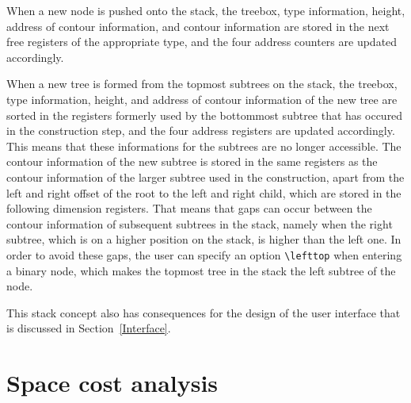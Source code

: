                                                                                 
When a new node is pushed onto the stack, the treebox, type information,        
height, address of contour information, and contour information are             
stored in the next free registers of the appropriate type, and the              
four address counters are updated accordingly.                                  
                                                                                
When a new tree is formed from the topmost subtrees on the stack,               
the treebox, type information, height, and address of contour information       
of the new tree are sorted in the registers formerly used by the bottommost     
subtree that has occured in the construction step, and the four address registers are       
updated accordingly. This means that these informations for the subtrees        
are no longer accessible. The contour information of the new subtree            
is stored in the same registers as the contour information of the larger        
subtree used in the construction, apart from the left and right offset          
of the root to the left and right child, which are stored in the                
following dimension registers. That means that gaps can occur                   
between the contour information of subsequent subtrees in the                    
stack, namely when the right subtree, which is on a higher position on the      
stack, is higher than the left one. In order to avoid these                     
gaps, the user can specify an option \verb.\lefttop. when entering a            
binary node, which makes the topmost tree in the stack the                      
left subtree of the node.                                                       
                                                                                
This stack concept also has consequences for the design of the user interface   
that is discussed in Section~\ref{Interface}.                                   
                                                                                
\section{Space cost analysis}                                                   
                                                                                
